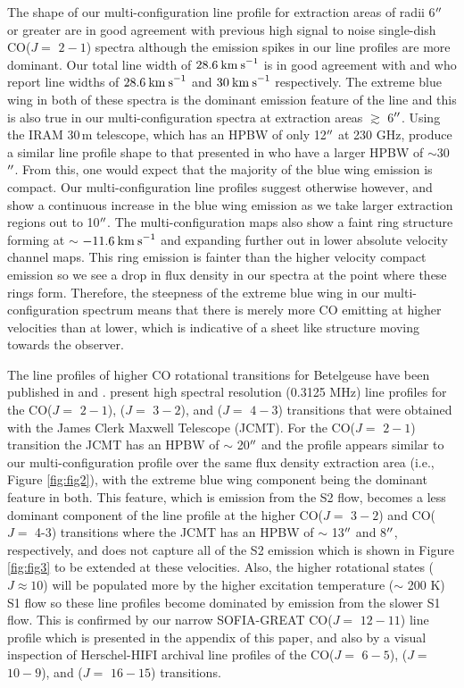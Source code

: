 \documentclass[iop]{emulateapj}
\begin{document}
The shape of our multi-configuration line profile for extraction areas of radii 6$\mbox{$^{\prime\prime}$}$ or greater are in good agreement with previous high signal to noise single-dish CO($J=$ $2-1$) spectra \cite[e.g.][Figure 1]{1994ApJ...424L.127H} although the emission spikes in our line profiles are more dominant. Our total line width of $28.6\>{\rm km\>s}^{-1}$ is in good agreement with \cite{1987ApJ...313..400H} and \cite{1994ApJ...424L.127H} who report line widths of $28.6\>{\rm km\>s}^{-1}$ and $30\>{\rm km\>s}^{-1}$ respectively. The extreme blue wing in both of these spectra is the dominant emission feature of the line and this is also true in our multi-configuration spectra at extraction areas $\gtrsim$ 6$\mbox{$^{\prime\prime}$}$. Using the IRAM 30\,m telescope, which has an HPBW of only 12$\mbox{$^{\prime\prime}$}$ at 230 GHz, \cite{1994ApJ...424L.127H} produce a similar line profile shape to that presented in \cite{1987ApJ...313..400H} who have a larger HPBW of $\sim$30$\mbox{$^{\prime\prime}$}$. From this, one would expect that the majority of the blue wing emission is compact. Our multi-configuration line profiles suggest otherwise however, and show a continuous increase in the blue wing emission as we take larger extraction regions out to 10$\mbox{$^{\prime\prime}$}$. The multi-configuration maps also show a faint ring structure forming at $\sim$ $-11.6\>{\rm km\>s}^{-1}$ and expanding further out in lower absolute velocity channel maps. This ring emission is fainter than the higher velocity compact emission so we see a drop in flux density in our spectra at the point where these rings form. Therefore, the steepness of the extreme blue wing in our multi-configuration spectrum means that there is merely more CO emitting at higher velocities than at lower, which is indicative of a sheet like structure moving towards the observer.

The line profiles of higher CO rotational transitions for Betelgeuse have been published in \cite{2003A&A...407..609K} and \cite{2010A&A...523A..18D}. \cite{2010A&A...523A..18D} present high spectral resolution (0.3125 MHz) line profiles for the CO($J=$ $2-1$), ($J=$ $3-2$), and ($J=$ $4-3$) transitions that were obtained with the James Clerk Maxwell Telescope (JCMT). For the CO($J=$ $2-1$) transition the JCMT has an HPBW of $\sim$ 20$\mbox{$^{\prime\prime}$}$ and the profile appears similar to our multi-configuration profile over the same flux density extraction area (i.e., Figure \ref{fig:fig2}), with the extreme blue wing component being the dominant feature in both. This feature, which is emission from the S2 flow, becomes a less dominant component of the line profile at the higher CO($J=$ $3-2$) and CO($J=$ 4-3) transitions where the JCMT has an HPBW of $\sim$ 13$\mbox{$^{\prime\prime}$}$ and 8$\mbox{$^{\prime\prime}$}$, respectively, and does not capture all of the S2 emission which is shown in Figure \ref{fig:fig3} to be extended at these velocities. Also, the higher rotational states ($J\approx 10$) will be populated more by the higher excitation temperature ($\sim$ 200 K) S1 flow so these line profiles become dominated by emission from the slower S1 flow. This is confirmed by our narrow SOFIA-GREAT CO($J=$ $12-11$) line profile which is presented in the appendix of this paper, and also by a visual inspection of Herschel-HIFI archival line profiles of the CO($J=$ $6-5$), ($J=$ $10-9$), and ($J=$ $16-15$) transitions.
\end{document}
